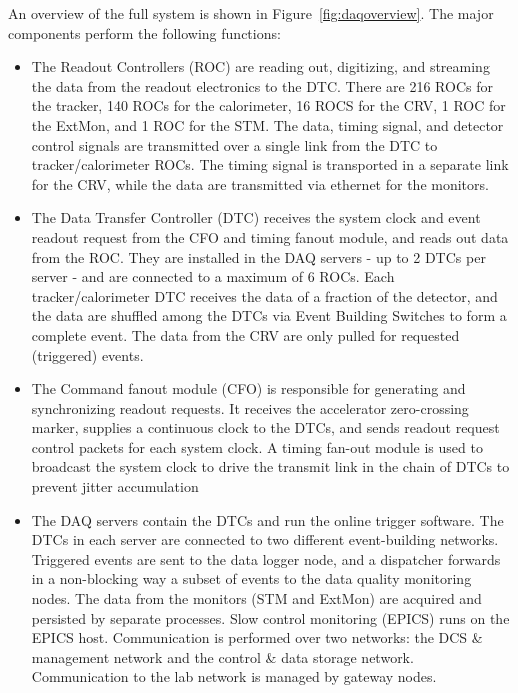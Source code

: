 An overview of the full system is shown in Figure~\ref{fig:daqoverview}. The major components perform the following functions:
\begin{itemize} 
\item The Readout Controllers (ROC) are reading out, digitizing, and streaming the data from the readout electronics to the DTC. There are 216 ROCs for the tracker, 140 ROCs for the calorimeter, 16 ROCS for the CRV, 1 ROC for the ExtMon, and 1 ROC for the STM. The data, timing signal, and detector control signals are transmitted over a single link from the DTC to tracker/calorimeter ROCs. The timing signal is transported in a separate link for the CRV, while the data are transmitted via ethernet for the monitors. 

\item The Data Transfer Controller (DTC) receives the system clock and event readout request from the CFO and timing fanout module, and reads out data from the ROC. They are installed in the DAQ servers - up to 2 DTCs per server - and are connected to a maximum of 6 ROCs. Each tracker/calorimeter DTC receives the data of a fraction of the detector, and the data are shuffled among the DTCs via Event Building Switches to form a complete event. The data from the CRV are only pulled for requested (triggered) events. 

\item The Command fanout module (CFO) is responsible for generating and synchronizing readout requests. It receives the accelerator zero-crossing marker, supplies a continuous clock to the DTCs, and sends readout request control packets for each system clock. A timing fan-out module is used to broadcast the system clock to drive the transmit link in the chain of DTCs to prevent jitter accumulation

\item The DAQ servers contain the DTCs and run the online trigger software. The DTCs in each server are connected to two different event-building networks. Triggered events are sent to the data logger node, and a dispatcher forwards in a non-blocking way a subset of events to the data quality monitoring nodes. The data from the monitors (STM and ExtMon) are acquired and persisted by separate processes. Slow control monitoring (EPICS) runs on the EPICS host. Communication is performed over two networks: the DCS \& management network and the control \& data storage network. Communication to the lab network is managed by gateway nodes. 
\end{itemize} 

